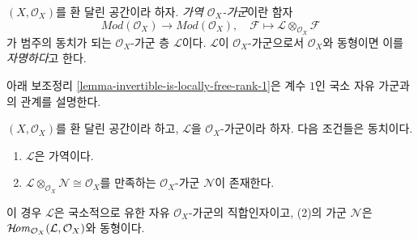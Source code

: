 \begin{definition}
\label{definition-invertible}
$(X, \mathcal{O}_X)$를 환 달린 공간이라 하자.
{\it 가역 $\mathcal{O}_X$-가군}이란 함자
$$
\textit{Mod}(\mathcal{O}_X) \longrightarrow \textit{Mod}(\mathcal{O}_X),\quad
\mathcal{F} \longmapsto \mathcal{L} \otimes_{\mathcal{O}_X} \mathcal{F}
$$
가 범주의 동치가 되는 $\mathcal{O}_X$-가군 층 $\mathcal{L}$이다.
$\mathcal{L}$이 $\mathcal{O}_X$-가군으로서 $\mathcal{O}_X$와 동형이면
이를 {\it 자명하다}고 한다.
\end{definition}

\noindent
아래 보조정리 \ref{lemma-invertible-is-locally-free-rank-1}은
계수 $1$인 국소 자유 가군과의 관계를 설명한다.

\begin{lemma}
\label{lemma-invertible}
$(X, \mathcal{O}_X)$를 환 달린 공간이라 하고, $\mathcal{L}$을
$\mathcal{O}_X$-가군이라 하자. 다음 조건들은 동치이다.
\begin{enumerate}
\item $\mathcal{L}$은 가역이다.
\item
$\mathcal{L} \otimes_{\mathcal{O}_X} \mathcal{N} \cong \mathcal{O}_X$를
만족하는 $\mathcal{O}_X$-가군 $\mathcal{N}$이 존재한다.
\end{enumerate}
이 경우 $\mathcal{L}$은 국소적으로 유한 자유 $\mathcal{O}_X$-가군의
직합인자이고, (2)의 가군 $\mathcal{N}$은
$\mathop{\mathcal{H}\!\mathit{om}}\nolimits_{\mathcal{O}_X}(\mathcal{L}, \mathcal{O}_X)$와 동형이다.
\end{lemma}

